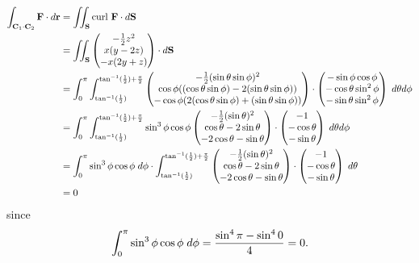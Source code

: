 \documentclass{article}
\begin{document}
\begin{align*}
    \int_{\textbf{C}_1\cdot\textbf{C}_2}\textbf{F}\cdot d\textbf{r} &= \iint_\textbf{S} \text{curl }\textbf{F}\cdot d\textbf{S}\\
    &= \iint_\textbf{S}\begin{pmatrix}-\frac{1}{2}z^2 \\ x(y-2z) \\ -x(2y+z)\end{pmatrix}\cdot d\textbf{S}\\
    &= \int_{0}^{\pi}\int_{\tan^{-1}(\frac{1}{2})}^{\tan^{-1}(\frac{1}{2})+\frac{\pi}{2}}\begin{pmatrix}-\frac{1}{2}(\sin\theta\sin\phi)^2 \\ \cos\phi((\cos\theta\sin\phi)-2(\sin\theta\sin\phi)) \\ -\cos\phi(2(\cos\theta\sin\phi)+(\sin\theta\sin\phi))\end{pmatrix}\cdot \begin{pmatrix}-\sin\phi\cos\phi \\ -\cos\theta\sin^2\phi \\ -\sin\theta\sin^2\phi\end{pmatrix} \hspace{1mm}d\theta d\phi\\
    &= \int_{0}^{\pi}\int_{\tan^{-1}(\frac{1}{2})}^{\tan^{-1}(\frac{1}{2})+\frac{\pi}{2}}\sin^3\phi\cos\phi\begin{pmatrix}-\frac{1}{2}(\sin\theta)^2 \\ \cos\theta-2\sin\theta \\ -2\cos\theta-\sin\theta\end{pmatrix}\cdot \begin{pmatrix}-1 \\ -\cos\theta \\ -\sin\theta\end{pmatrix} \hspace{1mm}d\theta d\phi\\
    &= \int_{0}^{\pi}\sin^3\phi\cos\phi\hspace{1mm}d\phi\cdot\int_{\tan^{-1}(\frac{1}{2})}^{\tan^{-1}(\frac{1}{2})+\frac{\pi}{2}}\begin{pmatrix}-\frac{1}{2}(\sin\theta)^2 \\ \cos\theta-2\sin\theta \\ -2\cos\theta-\sin\theta\end{pmatrix}\cdot \begin{pmatrix}-1 \\ -\cos\theta \\ -\sin\theta\end{pmatrix} \hspace{1mm}d\theta\\
    &= 0
\end{align*}
since
\[\int_{0}^{\pi}\sin^3\phi\cos\phi\hspace{1mm}d\phi = \frac{\sin^4\pi-\sin^4 0}{4} = 0.\]
\end{document}
